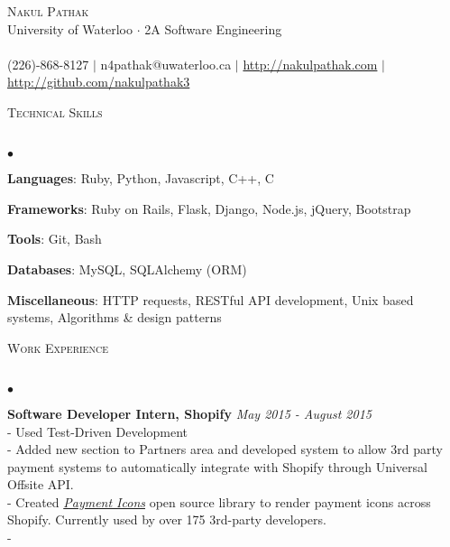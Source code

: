 \documentclass[10pt]{article}
\newcommand{\lineunder}{\vspace*{-8pt} \\ \hspace*{-18pt} \hrulefill \\}
\newcommand{\header}[1]{{\hspace*{-15pt}\vspace*{6pt} \textsc{#1}} \vspace*{-6pt} \lineunder}
\newenvironment{achievements}{\begin{list}{$\bullet$}{\topsep 0pt \itemsep -1.5pt \leftmargin 5pt}}{\vspace*{4pt}\end{list}}
\begin{document}
\small
\smallskip
\vspace*{-45pt}

\begin{center}
	{\Huge \scshape {Nakul Pathak}} \\
\vspace*{6pt} 
{\fontsize{10}{1}\selectfont University of Waterloo $\cdot$ 2A Software Engineering} \\
\vspace{-4pt}
\hspace*{-18pt} \hrulefill \\
\vspace{2pt}
\hspace*{-18pt} (226)-868-8127 $|$ n4pathak@uwaterloo.ca $|$ \url{http://nakulpathak.com} $|$  \url{http://github.com/nakulpathak3}
\vspace{-5pt}
\end{center}

\header{\normalsize Technical Skills}
\begin{achievements}
\item \textbf{Languages}: Ruby, Python, Javascript, C++, C
\item \textbf{Frameworks}: Ruby on Rails, Flask, Django, Node.js, jQuery, Bootstrap
\item \textbf{Tools}: Git, Bash
\item \textbf{Databases}: MySQL,  SQLAlchemy (ORM)
\item \textbf{Miscellaneous}: HTTP requests, RESTful API development, Unix based systems, Algorithms \& design patterns
\end{achievements}

\vspace{6pt}

\header{\normalsize Work Experience}
\begin{achievements}
\item \textbf{Software Developer Intern, Shopify} \hfill \textit {May 2015 - August 2015}
\\ - Used Test-Driven Development 
\\ - Added new section to Partners area and developed system to allow 3rd party payment systems to automatically integrate with Shopify through Universal Offsite API. 
\\ - Created \textit{\href{https://github.com/activemerchant/payment_icons}{Payment Icons}} open source library to render payment icons across Shopify. Currently used by over 175 3rd-party developers.
\\ - 
\end{achievements}
\end{document}
